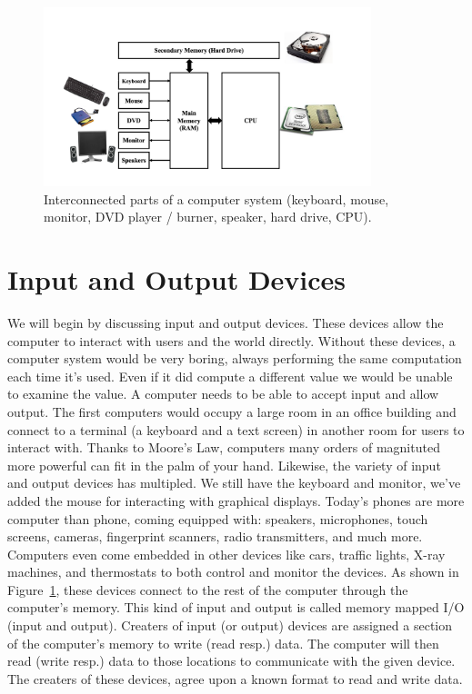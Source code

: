 \begin{figure}
	\centering
	\includegraphics[width=0.85\textwidth]{images/cs_intro_hardware_overview.png}
	\caption{Interconnected parts of a computer system (keyboard, mouse,
                 monitor, DVD player / burner, speaker, hard drive, CPU).}
	\label{fig:hardware:overview}
\end{figure}

\section{Input and Output Devices}

We will begin by discussing input and output devices. These devices
allow the computer to interact with users and the world directly. Without
these devices, a computer system would be very boring, always performing
the same computation each time it's used. Even if it did compute a different
value we would be unable to examine the value. A computer needs to be
able to accept input and allow output. The first computers would occupy
a large room in an office building and connect to a terminal
(a keyboard and a text screen) in another room for users to interact
with. Thanks to Moore's Law, computers many orders of magnituted more
powerful can fit in the palm of your hand. Likewise, the variety of input
and output devices has multipled. We still have the keyboard and monitor,
we've added the mouse for interacting with graphical displays. Today's
phones are more computer than phone, coming equipped with: speakers,
microphones, touch screens, cameras, fingerprint scanners, radio transmitters,
and much more. Computers even come embedded in other devices like cars,
traffic lights, X-ray machines, and thermostats to both control and
monitor the devices. As shown in Figure~\ref{fig:hardware:overview},
these devices connect to the rest of the computer through the computer's memory.
This kind of input and output is called memory mapped I/O (input and output).
Creaters of input (or output) devices are assigned a section of the
computer's memory to write (read resp.) data. The computer will then read
(write resp.) data to those locations to communicate with the given device.
The creaters of these devices, agree upon a known format to read and write data.

